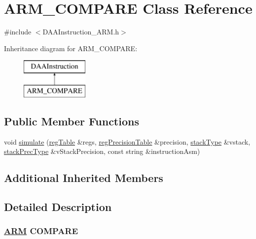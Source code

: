 \hypertarget{classARM__COMPARE}{}\section{A\+R\+M\+\_\+\+C\+O\+M\+P\+A\+RE Class Reference}
\label{classARM__COMPARE}


{\ttfamily \#include $<$D\+A\+A\+Instruction\+\_\+\+A\+R\+M.\+h$>$}

Inheritance diagram for A\+R\+M\+\_\+\+C\+O\+M\+P\+A\+RE\+:\begin{figure}[H]
\begin{center}
\leavevmode
\includegraphics[height=2.000000cm]{classARM__COMPARE}
\end{center}
\end{figure}
\subsection*{Public Member Functions}
\begin{DoxyCompactItemize}
\item 
void \hyperlink{classARM__COMPARE_ae9edd15b40befea710d1de4be1bbeecb}{simulate} (\hyperlink{DAAInstruction_8h_af0fae93a861de9cf37988d5673cac523}{reg\+Table} \&regs, \hyperlink{DAAInstruction_8h_a0e8cae02815a5f8adc750122d790b455}{reg\+Precision\+Table} \&precision, \hyperlink{DAAInstruction_8h_a1b0e70ac1a04f06c8132055ed01f589f}{stack\+Type} \&vstack, \hyperlink{DAAInstruction_8h_ac5cb793e9dac3fa9693da78b7e29ab30}{stack\+Prec\+Type} \&v\+Stack\+Precision, const string \&instruction\+Asm)
\end{DoxyCompactItemize}
\subsection*{Additional Inherited Members}


\subsection{Detailed Description}


 \subsubsection*{\hyperlink{classARM}{A\+RM} C\+O\+M\+P\+A\+RE }

